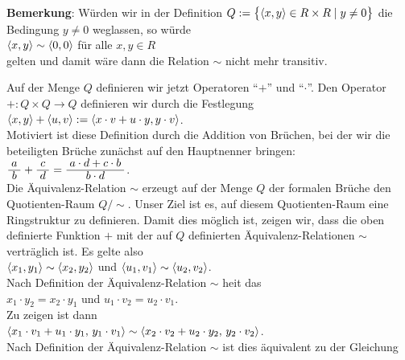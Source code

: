 \begin{enumerate}
      \textbf{Bemerkung}: W\"{u}rden wir in der Definition 
      $Q := \bigl\{ \pair(x, y) \in R \times R \mid y \not= 0 \bigr\}$
      die Bedingung $y \not= 0$ weglassen, so w\"{u}rde 
      \\[0.2cm]
      \hspace*{1.3cm}
      $\pair(x, y) \sim \pair(0, 0)$ \quad f\"{u}r alle $x,y \in R$
      \\[0.2cm]
      gelten und damit w\"{a}re dann die Relation $\sim$ nicht mehr transitiv.
\end{enumerate}
Auf der Menge $Q$ definieren wir jetzt Operatoren ``$+$'' und ``$\cdot$''.
Den Operator $+: Q \times Q \rightarrow Q$  definieren wir durch die Festlegung
\\[0.2cm]
\hspace*{1.3cm}
$\pair(x,y) + \pair(u,v) := \pair(x \cdot v + u \cdot y, y \cdot v)$.
\\[0.2cm]
Motiviert ist diese Definition durch die Addition von Br\"{u}chen, bei der wir die beteiligten Br\"{u}che
zun\"{a}chst auf den Hauptnenner bringen:
\\[0.2cm]
\hspace*{1.3cm}
$\bruch{a}{b} + \bruch{c}{d} = \bruch{a \cdot d + c \cdot b}{b \cdot d}$.
\\[0.2cm]
Die \"{A}quivalenz-Relation $\sim$ erzeugt auf der Menge $Q$ der formalen Br\"{u}che den Quotienten-Raum
$Q/\!\sim$.
Unser Ziel ist es, auf diesem Quotienten-Raum 
eine Ringstruktur zu definieren.  Damit dies m\"{o}glich ist, zeigen wir, dass die oben definierte
Funktion $+$ mit der auf $Q$ definierten \"{A}quivalenz-Relationen $\sim$ 
vertr\"{a}glich ist.  Es gelte also
\\[0.2cm]
\hspace*{1.3cm}
$\pair(x_1,y_1) \sim \pair(x_2,y_2)$ \quad und \quad
$\pair(u_1,v_1) \sim \pair(u_2,v_2)$.
\\[0.2cm]
Nach Definition der \"{A}quivalenz-Relation $\sim$ hei\3t das
\\[0.2cm]
\hspace*{1.3cm}
$x_1 \cdot y_2 = x_2 \cdot y_1$ \quad und \quad
$u_1 \cdot v_2 = u_2 \cdot v_1$.
\\[0.2cm]
Zu zeigen ist dann
\\[0.2cm]
\hspace*{1.3cm}
$\pair(x_1 \cdot v_1 + u_1 \cdot y_1,\, y_1 \cdot v_1) \sim 
 \pair(x_2 \cdot v_2 + u_2 \cdot y_2,\, y_2 \cdot v_2)$.
\\[0.2cm]
Nach Definition der \"{A}quivalenz-Relation $\sim$ ist dies \"{a}quivalent zu der Gleichung
